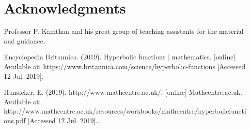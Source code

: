 \documentclass[12pt]{report}
\begin{document}
\newpage
\section{Acknowledgments}

 Professor P. Kamthan and his great group of teaching assistants for the material and guidance.
\newpage
 
\begin{thebibliography}{111}
   
Encyclopedia Britannica. (2019). Hyperbolic functions | mathematics. [online] Available at: https://www.britannica.com/science/hyperbolic-functions [Accessed 12 Jul. 2019].

{}
    Hunsicker, E. (2019). http://www.mathcentre.ac.uk/. [online] Mathcentre.ac.uk. Available at: http://www.mathcentre.ac.uk/resources/workbooks/mathcentre/hyperbolicfunctions.pdf [Accessed 12 Jul. 2019]..

\end{thebibliography}


%
%
\end{document}
